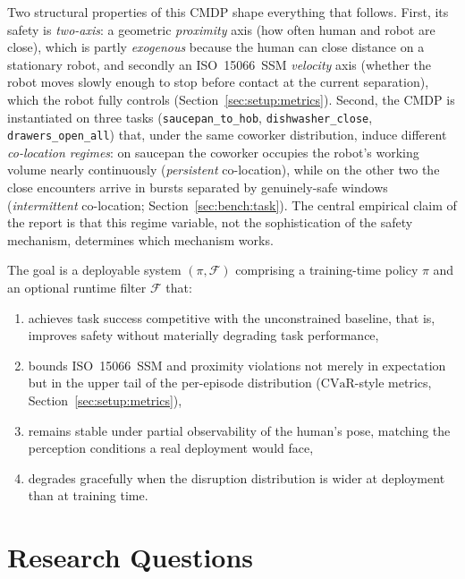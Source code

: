 \documentclass[11pt,a4paper]{report}
\newcommand{\ssm}{SSM}
\newcommand{\iso}{ISO~15066}
\newcommand{\cvar}{\ensuremath{\mathrm{CVaR}}}
\begin{document}
Two structural properties of this CMDP shape everything that
follows. First, its safety is \emph{two-axis}: a geometric
\emph{proximity} axis (how often human and robot are close), which is
partly \emph{exogenous} because the human can close distance on a
stationary robot, and secondly an \iso{}~\ssm{} \emph{velocity} axis (whether
the robot moves slowly enough to stop before contact at the current
separation), which the robot fully controls
(Section~\ref{sec:setup:metrics}). Second, the CMDP is instantiated
on three tasks (\texttt{saucepan\_to\_hob}, \texttt{dishwasher\_close},
\texttt{drawers\_open\_all}) that, under the same coworker
distribution, induce different \emph{co-location regimes}: on
saucepan the coworker occupies the robot's working volume nearly
continuously (\emph{persistent} co-location), while on the other two
the close encounters arrive in bursts separated by genuinely-safe
windows (\emph{intermittent} co-location;
Section~\ref{sec:bench:task}). The central empirical claim of the
report is that this regime variable, not the sophistication of the
safety mechanism, determines which mechanism works.

The goal is a deployable system $(\pi, \mathcal{F})$ comprising a
training-time policy $\pi$ and an optional runtime filter
$\mathcal{F}$ that:
\begin{enumerate}[topsep=2pt,itemsep=1pt]
\item achieves task success competitive with the unconstrained
  baseline, that is, improves safety without materially degrading
  task performance,
\item bounds \iso{}~\ssm{} and proximity violations not merely in
  expectation but in the upper tail of the per-episode distribution
  (\cvar{}-style metrics, Section~\ref{sec:setup:metrics}),
\item remains stable under partial observability of the human's pose,
  matching the perception conditions a real deployment would face,
\item degrades gracefully when the disruption distribution is wider
  at deployment than at training time.
\end{enumerate}

\section{Research Questions}
\label{sec:intro:rqs}
\end{document}
